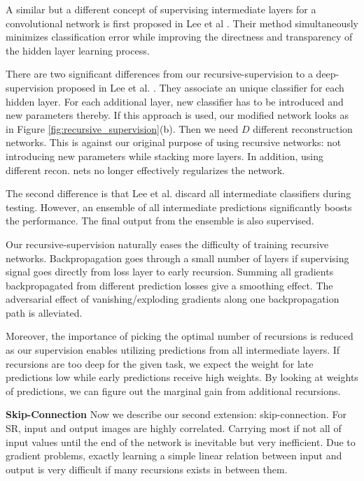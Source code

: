 \documentclass[10pt,twocolumn,letterpaper]{article}
\begin{document}
A similar but a different concept of supervising intermediate layers for a convolutional network is first proposed in Lee et al  \cite{lee2014deeply}. Their method simultaneously minimizes classification error while improving the directness and transparency of the hidden layer learning process.

There are two significant differences from our recursive-supervision to a deep-supervision proposed in Lee et al. \cite{lee2014deeply}. They associate an unique classifier for each hidden layer. For each additional layer, new classifier has to be introduced and new parameters thereby. If this approach is used, our modified network looks as in Figure \ref{fig:recursive_supervision}(b). Then we need $D$ different reconstruction networks. This is against our original purpose of using recursive networks: not introducing new parameters while stacking more layers. In addition, using different recon. nets no longer effectively regularizes the network.

The second difference is that Lee et al. \cite{lee2014deeply} discard all intermediate classifiers during testing. However, an ensemble of all intermediate predictions significantly boosts the performance. The final output from the ensemble is also supervised.

Our recursive-supervision naturally eases the difficulty of training recursive networks. Backpropagation goes through a small number of layers if supervising signal goes directly from loss layer to early recursion. Summing all gradients backpropagated from different prediction losses give a smoothing effect. The adversarial effect of vanishing/exploding gradients along one backpropagation path is alleviated.

Moreover, the importance of picking the optimal number of recursions is reduced as our supervision enables utilizing predictions from all intermediate layers. If recursions are too deep for the given task, we expect the weight for late predictions low while early predictions receive high weights. By looking at weights of predictions, we can figure out the marginal gain from additional recursions. 

\textbf{Skip-Connection} Now we describe our second extension: skip-connection. For SR, input and output images are highly correlated. Carrying most if not all of input values until the end of the network is inevitable but very inefficient. Due to gradient problems, exactly learning a simple linear relation between input and output is very difficult if many recursions exists in between them.  
\end{document}
